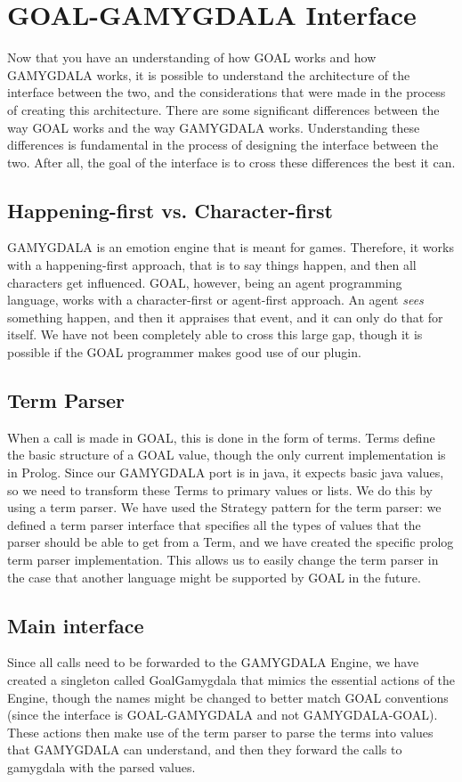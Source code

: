 \section{GOAL-GAMYGDALA Interface}
Now that you have an understanding of how GOAL works and how GAMYGDALA works, it is possible to understand the architecture of the interface between the two, and the considerations that were made in the process of creating this architecture.
There are some significant differences between the way GOAL works and the way GAMYGDALA works. Understanding these differences is fundamental in the process of designing the interface between the two. After all, the goal of the interface is to cross these differences the best it can.

\subsection{Happening-first vs. Character-first}
GAMYGDALA is an emotion engine that is meant for games. Therefore, it works with a happening-first approach, that is to say things happen, and then all characters get influenced. GOAL, however, being an agent programming language, works with a character-first or agent-first approach. An agent \emph{sees} something happen, and then it appraises that event, and it can only do that for itself. We have not been completely able to cross this large gap, though it is possible if the GOAL programmer makes good use of our plugin.

\subsection{Term Parser}
When a call is made in GOAL, this is done in the form of terms. Terms define the basic structure of a GOAL value, though the only current implementation is in Prolog. Since our GAMYGDALA port is in java, it expects basic java values, so we need to transform these Terms to primary values or lists. We do this by using a term parser.
We have used the Strategy pattern for the term parser: we defined a term parser interface that specifies all the types of values that the parser should be able to get from a Term, and we have created the specific prolog term parser implementation. This allows us to easily change the term parser in the case that another language might be supported by GOAL in the future.

\subsection{Main interface}
Since all calls need to be forwarded to the GAMYGDALA Engine, we have created a singleton called GoalGamygdala that mimics the essential actions of the Engine, though the names might be changed to better match GOAL conventions (since the interface is GOAL-GAMYGDALA and not GAMYGDALA-GOAL). These actions then make use of the term parser to parse the terms into values that GAMYGDALA can understand, and then they forward the calls to gamygdala with the parsed values.

